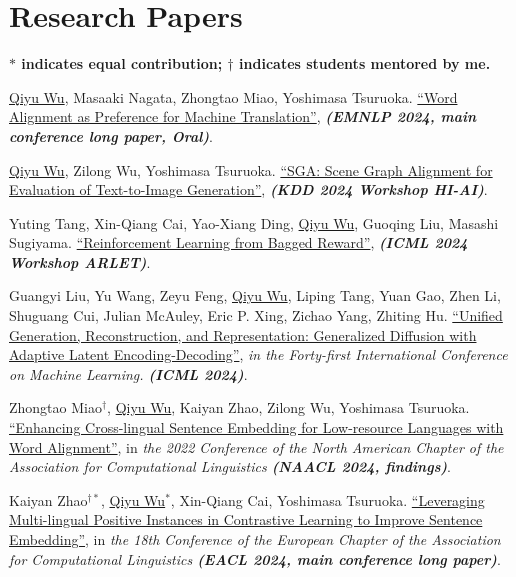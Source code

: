 \documentclass{resume}
\begin{document}
  \section{\textbf{Research Papers}}
  \textbf{$*$ indicates equal contribution; $\dagger$ indicates students mentored by me.}
  \vspace{-5pt}
  \begin{description}[leftmargin=*]
    
    \item [{[C12]}] \underline{Qiyu Wu}, Masaaki Nagata, Zhongtao Miao, Yoshimasa Tsuruoka. \href{https://arxiv.org/abs/2405.09223}{``Word Alignment as Preference for Machine Translation''}, \textit{\textbf{(EMNLP 2024, main conference long paper, Oral)}}.

    \item [{[C11]}] \underline{Qiyu Wu}, Zilong Wu, Yoshimasa Tsuruoka. \href{https://human-interpretable-ai.github.io/assets/pdf/10_SGA_Scene_Graph_Alignment_f.pdf}{``SGA: Scene Graph Alignment for Evaluation of Text-to-Image Generation''}, \textit{\textbf{(KDD 2024 Workshop HI-AI)}}.

    \item [{[C10]}] Yuting Tang, Xin-Qiang Cai, Yao-Xiang Ding, \underline{Qiyu Wu}, Guoqing Liu, Masashi Sugiyama. \href{https://arxiv.org/pdf/2402.03771.pdf}{``Reinforcement Learning from Bagged Reward''}, \textit{\textbf{(ICML 2024 Workshop ARLET)}}.
    
    \item [{[C9]}] Guangyi Liu, Yu Wang, Zeyu Feng, \underline{Qiyu Wu}, Liping Tang, Yuan Gao, Zhen Li, Shuguang Cui, Julian McAuley, Eric P. Xing, Zichao Yang, Zhiting Hu. \href{https://arxiv.org/abs/2402.19009}{``Unified Generation, Reconstruction, and Representation: Generalized Diffusion with Adaptive Latent Encoding-Decoding''}, \textit{in the Forty-first International Conference on Machine Learning. \textbf{(ICML 2024)}}.
    
    \item [{[C8]}] Zhongtao Miao$^{\dagger}$, \underline{Qiyu Wu}, Kaiyan Zhao, Zilong Wu, Yoshimasa Tsuruoka. \href{https://aclanthology.org/2024.findings-naacl.204/}{``Enhancing Cross-lingual Sentence Embedding for Low-resource Languages with Word Alignment''}, in \textit{the 2022 Conference of the North American Chapter of the Association for Computational Linguistics \textbf{(NAACL 2024, findings)}}.
    
    \item [{[C7]}] Kaiyan Zhao$^{\dagger*}$, \underline{Qiyu Wu$^*$}, Xin-Qiang Cai, Yoshimasa Tsuruoka. \href{https://arxiv.org/abs/2309.08929}{``Leveraging Multi-lingual Positive Instances in Contrastive Learning to Improve Sentence Embedding''}, in \textit{the 18th Conference of the European Chapter of the Association for Computational Linguistics \textbf{(EACL 2024, main conference long paper)}}.


\end{description}
\end{document}
